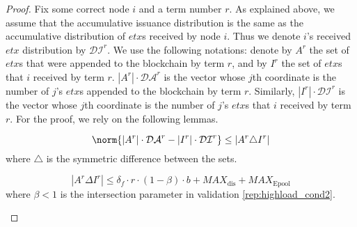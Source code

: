\begin{proof}
Fix some correct node $i$ and a term number $r$. As explained above, we assume that the accumulative issuance distribution is the same as the accumulative distribution of $etx$s received by node $i$. Thus we denote $i$'s received $etx$ distribution by $\mathcal{DI}^r$. We use the following notations: denote by $A^r$ the set of $etx$s that were appended to the blockchain by term $r$, and by $I^{r}$ the set of $etx$s that $i$ received by term $r$. $|A^r|\cdot \mathcal{DA}^r$ is the vector whose $j$th coordinate is the number of $j$'s $etx$s appended to the blockchain by term $r$. Similarly, $|I^r|\cdot \mathcal{DI}^{r}$ is the vector whose $j$th coordinate is the number of $j$'s $etx$s that $i$ received by term $r$. 
For the proof, we rely on the following lemmas.

\begin{lemma} \label{lemma:rep_symetric}
\begin{equation} \label{eq:rep_symetric}
\norm{|A^r|\cdot \mathcal{DA}^r-|I^{r}|\cdot\mathcal{DI}^{r}}\leq \left | A^r \triangle I^{r} \right | 
\end{equation}
where $\triangle$ is the symmetric difference between the sets. 
\end{lemma}
\begin{lemma} \label{lemma:rep_AminusI} 
 \begin{equation}|A^r\Delta I^r |\leq \delta_f\cdot r \cdot (1-\beta)\cdot b+MAX_\text{dis}+MAX_\text{Epool}
 \end{equation}
 where $\beta<1$ is the intersection parameter in validation \ref{rep:highload_cond2}.
\end{lemma}




\end{proof}
